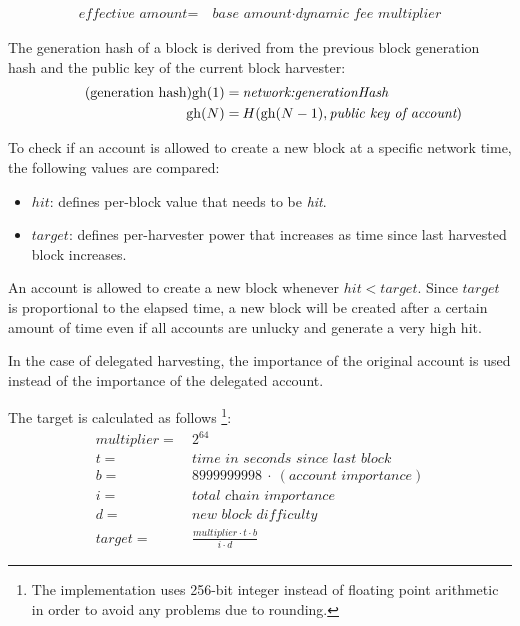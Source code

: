 \begin{align*}
\textit{effective amount} = \: & \textit{base amount} \cdot \textit{dynamic fee multiplier}
\end{align*}


The generation hash of a block is derived from the previous block generation hash and the public key of the current block harvester:
\begin{align*}
\tag{generation hash}
\mathfunc{gh}(1) = \: & \nemsetting{network}{generationHash} \\
\mathfunc{gh}(N) = \: & H(\mathfunc{gh}(N - 1), \textit{public key of account})
\end{align*}

To check if an account is allowed to create a new block at a specific network time, the following values are compared:
\begin{itemize}
\item{ $hit$: defines per-block value that needs to be \textit{hit}.}
\item{ $target$: defines per-harvester power that increases as time since last harvested block increases.}
\end{itemize}
An account is allowed to create a new block whenever $\mathit{hit} < \mathit{target}$.
Since $\mathit{target}$ is proportional to the elapsed time, a new block will be created after a certain amount of time even if all accounts are unlucky and generate a very high hit.

In the case of delegated harvesting, the importance of the original account is used instead of the importance of the delegated account.

The target is calculated as follows
\footnote{The implementation uses 256-bit integer instead of floating point arithmetic in order to avoid any problems due to rounding.}:
\begin{align*}
\mathit{multiplier} = \: & 2^{64} \\
t = \: & \textit{time in seconds since last block} \\
b = \: & 8999999998 \: \cdot \: (\textit{account importance}) \\
i = \: & \textit{total chain importance} \\
d = \: & \textit{new block difficulty} \\
\mathit{target} = \: & \frac{multiplier \cdot t \cdot b}{i \cdot d}
\end{align*}

